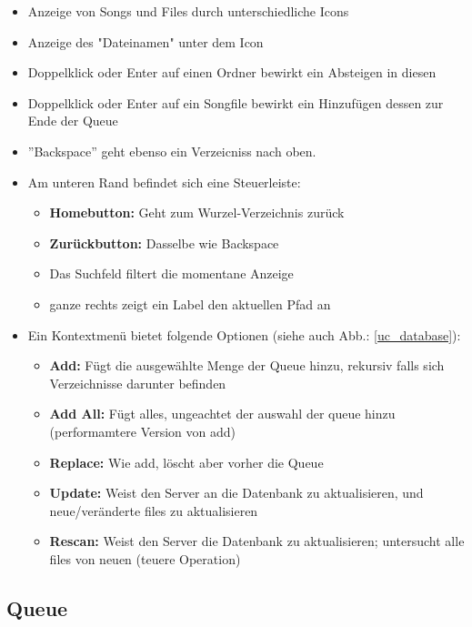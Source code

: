 \begin{itemize}
    \item Anzeige von Songs und Files durch unterschiedliche Icons
    \item Anzeige des "Dateinamen" unter dem Icon
    \item Doppelklick oder Enter auf einen Ordner bewirkt ein Absteigen in diesen
    \item Doppelklick oder Enter auf ein Songfile bewirkt ein Hinzufügen dessen zur Ende der Queue
    \item ''Backspace'' geht ebenso ein Verzeicniss nach oben.
    \item Am unteren Rand befindet sich eine Steuerleiste:
        \begin{itemize}
            \item \textbf{Homebutton:} Geht zum Wurzel-Verzeichnis zurück
            \item \textbf{Zurückbutton:} Dasselbe wie Backspace
            \item Das Suchfeld filtert die momentane Anzeige
            \item ganze rechts zeigt ein Label den aktuellen Pfad an
        \end{itemize}
    \item Ein Kontextmenü bietet folgende Optionen (siehe auch Abb.: \ref{uc_database}):
        \begin{itemize}
            \item \textbf{Add:} Fügt die ausgewählte Menge der Queue hinzu, rekursiv falls sich Verzeichnisse darunter befinden
            \item \textbf{Add All:} Fügt alles, ungeachtet der auswahl der queue hinzu (performamtere Version von add)
            \item \textbf{Replace:} Wie add, löscht aber vorher die Queue
            \item \textbf{Update:} Weist den Server an die Datenbank zu aktualisieren, und neue/veränderte files zu aktualisieren
            \item \textbf{Rescan:} Weist den Server die Datenbank zu aktualisieren; untersucht alle files von neuen (teuere Operation)
        \end{itemize}
\end{itemize}


\subsection{Queue}

